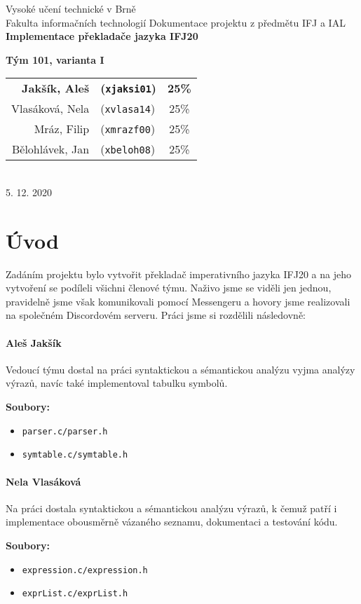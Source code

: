 \documentclass[czech,a4paper,12pt]{article}[]
\begin{document}
\begin{center}
\LARGE{Vysoké učení technické v Brně \\
Fakulta informačních technologií}
\vfill 
\LARGE{Dokumentace projektu z předmětu IFJ a IAL}\\
\Huge{\textbf{Implementace překladače jazyka IFJ20}}\\
\vfill
\large{\textbf{Tým 101, varianta I}\\
\begin{tabular}{ r l c}
\textbf{Jakšík, Aleš} & \textbf{(\texttt{xjaksi01})} & \textbf{25\%} \\ 
Vlasáková, Nela & (\texttt{xvlasa14}) & 25\% \\  
Mráz, Filip & (\texttt{xmrazf00}) & 25\% \\
Bělohlávek, Jan & (\texttt{xbeloh08}) & 25\% 
\end{tabular}
}\\[3em]
5. 12. 2020
\end{center}

\newpage

\tableofcontents

\newpage

\section{Úvod}
Zadáním projektu bylo vytvořit překladač imperativního jazyka IFJ20 a na jeho vytvoření se podíleli všichni členové týmu. Naživo jsme se viděli jen jednou, pravidelně jsme však komunikovali pomocí Messengeru a hovory jsme realizovali na společném Discordovém serveru. Práci jsme si rozdělili následovně:

\paragraph{Aleš Jakšík}
\begin{inpar}
Vedoucí týmu dostal na práci syntaktickou a sémantickou analýzu vyjma analýzy výrazů, navíc také implementoval tabulku symbolů.

\medskip
\textbf{Soubory:}
    \begin{itemize}
    \item \texttt{parser.c/parser.h}
    \item \texttt{symtable.c/symtable.h}
\end{itemize}
\end{inpar}

\paragraph{Nela Vlasáková}
\begin{inpar}
Na práci dostala syntaktickou a sémantickou analýzu výrazů, k čemuž patří i implementace obousměrně vázaného seznamu, dokumentaci a testování kódu.

\medskip
\textbf{Soubory:}
\begin{itemize}
    \item \texttt{expression.c/expression.h}
    \item \texttt{exprList.c/exprList.h}
\end{itemize}
\end{inpar}    
\end{document}
